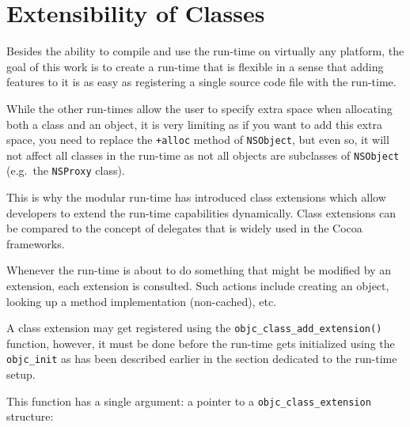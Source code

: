 \section{Extensibility of Classes}

Besides the ability to compile and use the run-time on virtually any platform, the goal of this work is to create a run-time that is flexible in a sense that adding features to it is as easy as registering a single source code file with the run-time.

While the other run-times allow the user to specify extra space when allocating both a class and an object, it is very limiting as if you want to add this extra space, you need to replace the \verb=+alloc= method of \verb=NSObject=, but even so, it will not affect all classes in the run-time as not all objects are subclasses of \verb=NSObject= (e.g.\ the \verb=NSProxy= class).

This is why the modular run-time has introduced class extensions which allow developers to extend the run-time capabilities dynamically. Class extensions can be compared to the concept of delegates that is widely used in the Cocoa frameworks. 

Whenever the run-time is about to do something that might be modified by an extension, each extension is consulted. Such actions include creating an object, looking up a method implementation (non-cached), etc.

A class extension may get registered using the \verb=objc_class_add_extension()= function, however, it must be done before the run-time gets initialized using the \verb=objc_init= as has been described earlier in the section dedicated to the run-time setup.

This function has a single argument: a pointer to a \verb=objc_class_extension= structure:

